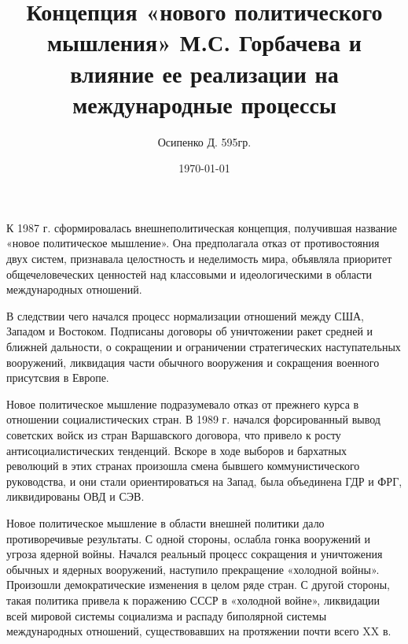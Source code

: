 \documentclass[a4paper, 12pt]{article}
\title{Концепция «нового политического мышления» М.С. Горбачева и влияние ее реализации на международные процессы}
\author{Осипенко Д. 595гр.}
\date{\today}
\begin{document}
\sffamily
\maketitle
К 1987 г. сформировалась внешнеполитическая концепция, получившая название «новое политическое мышление». Она предполагала отказ от противостояния двух систем, признавала целостность и неделимость мира, объявляла приоритет общечеловеческих ценностей над классовыми и идеологическими в области международных отношений.

В следствии чего начался процесс нормализации отношений между США, Западом и Востоком. Подписаны договоры об уничтожении ракет средней и ближней дальности, о сокращении и ограничении стратегических наступательных вооружений, ликвидация части обычного вооружения и сокращения военного присутсвия в Европе.

Новое политическое мышление подразумевало отказ от прежнего курса в отношении социалистических стран. В 1989 г. начался форсированный вывод советских войск из стран Варшавского договора, что привело к росту антисоциалистических тенденций. Вскоре в ходе выборов и бархатных революций в этих странах произошла смена бывшего коммунистического руководства, и они стали ориентироваться на Запад, была объединена ГДР и ФРГ, ликвидированы ОВД и СЭВ.

Новое политическое мышление в области внешней политики дало противоречивые результаты. С одной стороны, ослабла гонка вооружений и угроза ядерной войны. Начался реальный процесс сокращения и уничтожения обычных и ядерных вооружений, наступило прекращение «холодной войны». Произошли демократические изменения в целом ряде стран. С другой стороны, такая политика привела к поражению СССР в «холодной войне», ликвидации всей мировой системы социализма и распаду биполярной системы международных отношений, существовавших на протяжении почти всего XX в.
\end{document}
